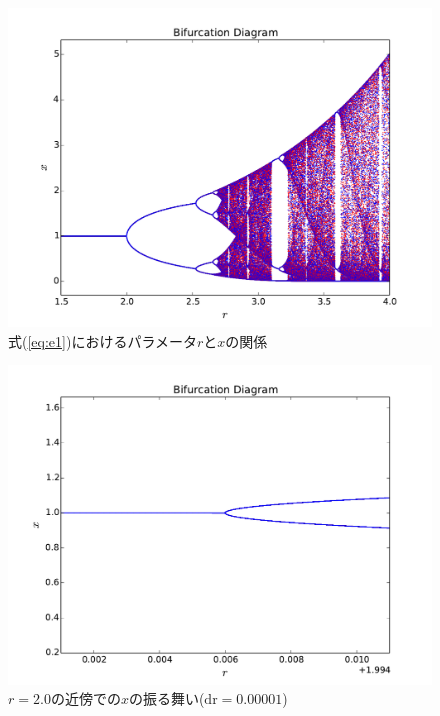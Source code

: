 \documentclass{jsarticle}
\begin{document}
\begin{enumerate}
\begin{enumerate}
				\begin{figure}[H]
					\begin{center}
						\includegraphics[width=12.5cm]{figure_1-4.pdf}
						\caption{式(\ref{eq:e1})におけるパラメータ$r$と$x$の関係}
						\label{fig:f4}
					\end{center}
				\end{figure}
				
				\begin{figure}[H]
					\begin{center}
						\includegraphics[width=12.5cm]{figure_1-4-2.pdf}
						\caption{$r=2.0$の近傍での$x$の振る舞い($\mathrm{dr}=0.00001$)}
						\label{fig:f4-2}
					\end{center}
				\end{figure}
				

\end{enumerate}
\end{enumerate}
\end{document}
